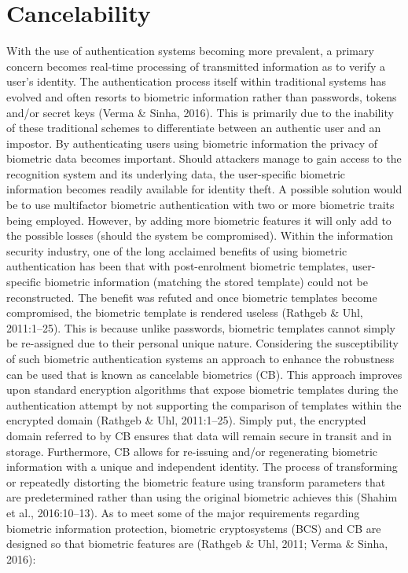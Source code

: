 \section[Cancelability]{Cancelability}
With the use of authentication systems becoming more prevalent, a primary concern becomes real-time processing of transmitted information as to verify a user’s identity. The authentication process itself within traditional systems has evolved and often resorts to biometric information rather than passwords, tokens and/or secret keys (Verma \& Sinha, 2016). This is primarily due to the inability of these traditional schemes to differentiate between an authentic user and an impostor. By authenticating users using biometric information the privacy of biometric data becomes important. Should attackers manage to gain access to the recognition system and its underlying data, the user-specific biometric information becomes readily available for identity theft. 
A possible solution would be to use multifactor biometric authentication with two or more biometric traits being employed. However, by adding more biometric features it will only add to the possible losses (should the system be compromised). Within the information security industry, one of the long acclaimed benefits of using biometric authentication has been that with post-enrolment biometric templates, user-specific biometric information (matching the stored template) could not be reconstructed. The benefit was refuted and once biometric templates become compromised, the biometric template is rendered useless (Rathgeb \& Uhl, 2011:1–25). This is because unlike passwords, biometric templates cannot simply be re-assigned due to their personal unique nature. Considering the susceptibility of such biometric authentication systems an approach to enhance the robustness can be used that is known as cancelable biometrics (CB). This approach improves upon standard encryption algorithms that expose biometric templates during the authentication attempt by not supporting the comparison of templates within the encrypted domain (Rathgeb \& Uhl, 2011:1–25). Simply put, the encrypted domain referred to by CB ensures that data will remain secure in transit and in storage. Furthermore, CB allows for re-issuing and/or regenerating biometric information with a unique and independent identity. The process of transforming or repeatedly distorting the biometric feature using transform parameters that are predetermined rather than using the original biometric achieves this (Shahim et al., 2016:10–13). As to meet some of the major requirements regarding biometric information protection, biometric cryptosystems (BCS) and CB are designed so that biometric features are (Rathgeb \& Uhl, 2011; Verma \& Sinha, 2016):

